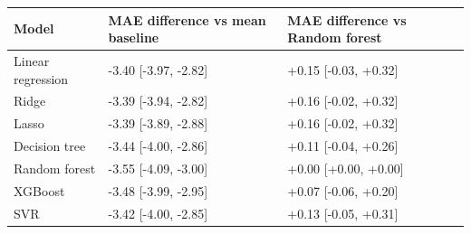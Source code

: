 \begin{tabular}{lll}
\toprule
\textbf{Model} & \textbf{MAE difference vs mean baseline} & \textbf{MAE difference vs Random forest} \\
\midrule
Linear regression & -3.40 [-3.97, -2.82] & +0.15 [-0.03, +0.32] \\
Ridge & -3.39 [-3.94, -2.82] & +0.16 [-0.02, +0.32] \\
Lasso & -3.39 [-3.89, -2.88] & +0.16 [-0.02, +0.32] \\
Decision tree & -3.44 [-4.00, -2.86] & +0.11 [-0.04, +0.26] \\
Random forest & -3.55 [-4.09, -3.00] & +0.00 [+0.00, +0.00] \\
XGBoost & -3.48 [-3.99, -2.95] & +0.07 [-0.06, +0.20] \\
SVR & -3.42 [-4.00, -2.85] & +0.13 [-0.05, +0.31] \\
\bottomrule
\end{tabular}
